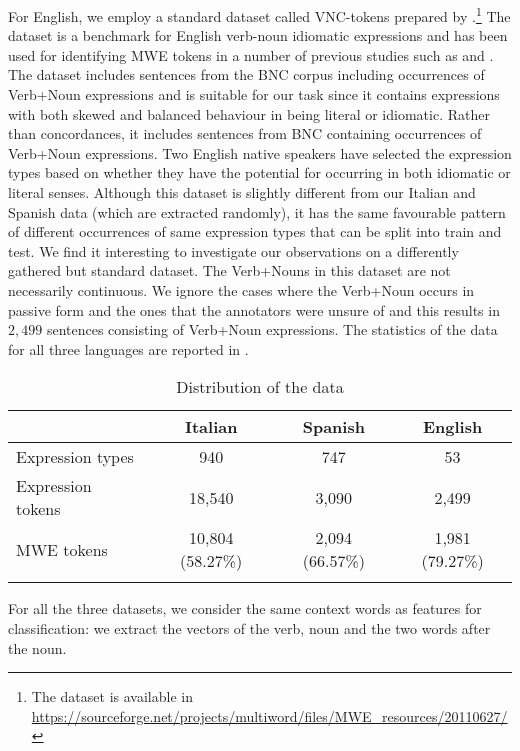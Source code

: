 \documentclass[output=paper
,modfonts
,nonflat]{langsci/langscibook}
\begin{document}
For English, we employ a standard dataset called VNC-tokens prepared by \cite{cook2008vnc}.\footnote{The dataset is available in \url{https://sourceforge.net/projects/multiword/files/MWE_resources/20110627/}} The dataset is a benchmark for English verb-noun idiomatic expressions and has been used for identifying MWE tokens in a number of previous studies such as \cite{fazly-cook-stevenson:2009:CL} and \cite{salton2016acl}.
The dataset includes sentences from the BNC corpus including occurrences of Verb+Noun expressions and is suitable for our task since it contains expressions with both skewed and balanced behaviour in being literal or idiomatic. 
Rather than concordances, it includes sentences from BNC containing occurrences of Verb+Noun expressions.
Two English native speakers have selected the expression types based on whether they have the potential for occurring in both idiomatic or literal senses. Although this dataset is slightly different from our Italian and Spanish data (which are extracted randomly), it has the same favourable pattern of different occurrences of same expression types that can be split into train and test. We find it interesting to investigate our observations on a differently gathered but standard dataset. 
The Verb+Nouns in this dataset are not necessarily continuous.
We ignore the cases where the Verb+Noun occurs in passive form and the ones that the annotators were unsure of and this results in $2,499$ sentences consisting of Verb+Noun expressions. The statistics of the data for all three languages are reported in .

\begin{table}[!ht]
\small
\caption{Distribution of the data}
\label{tab:data}
 \begin{tabular}{lccc} 
  \lsptoprule
    & Italian & Spanish & English  \\
  \midrule
   Expression types & 940 & 747 & 53 \\
   Expression tokens & 18,540 & 3,090 & 2,499  \\
   MWE tokens  & 10,804 (58.27\%) & 2,094 (66.57\%) & 1,981 (79.27\%)  \\
  \lspbottomrule
 \end{tabular}
\end{table}


For all the three datasets, we consider the same context words as features for classification: we extract the vectors of the verb, noun and the two words after the noun. 
\end{document}
